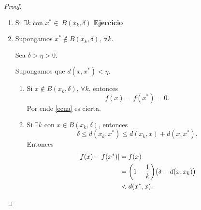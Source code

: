 \documentclass[a4,portrait]{seminar}
\begin{document}
\begin{slide*}
\begin{proof}
\begin{enumerate}
    \item Si $\exists k$ con $x^*\in\ B(x_k,\delta)$ \textbf{Ejercicio}

    \item Supongamos $x^*\notin B(x_k,\delta)$, $\forall k$.

            Sea $\delta >\eta>0$.

            Supongamos que $d(x,x^*)<\eta$.

    \begin{enumerate}

        \item Si $x\notin B(x_k,\delta)$, $\forall k$, entonces
                \[
                    f(x)=f(x^*)=0.
                \]
                Por ende \eqref{ecua} es cierta.



        \newpage

        \item Si $\exists k$ con $x\in B(x_k,\delta)$, entonces
        \[
            \delta \leq d(x_k,x^*)\leq
            d(x_k,x)+d(x,x^*).
        \]
        Entonces
        \begin{equation}
        \begin{split}
            |f(x)-f(x^*)|&=f(x)\\
            &=\biggl(1-\frac{1}{k}\biggr)\bigl(\delta-d(x,x_k)\bigr)\\
            &<d(x^*, x).
        \end{split}\notag
        \end{equation}
    \end{enumerate}
\end{enumerate}
\end{proof}













\end{slide*}
\end{document}

